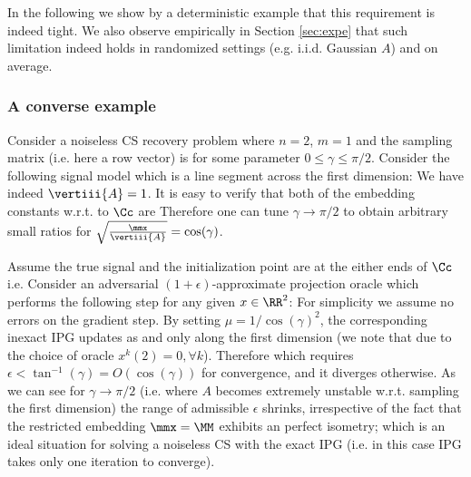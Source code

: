 In the following we show by a deterministic example that this requirement is indeed tight. We also observe empirically in Section \ref{sec:expe} that such limitation indeed holds in randomized settings (e.g. i.i.d. Gaussian $A$) and on average. 

\subsubsection*{A converse example}
Consider a noiseless CS recovery problem where $n =2$, $m=1$ and the sampling matrix (i.e. here a row vector) is
for some parameter $0\leq\gamma\leq\pi/2$. Consider the following signal model which is a line segment across the first dimension:
We have indeed $\vertiii{A}=1$. It is easy to verify that both of the embedding constants w.r.t. to $\Cc$ are
Therefore one can tune $\gamma\rightarrow \pi/2$ to obtain arbitrary small ratios for $\sqrt{\frac{\mmx}{\vertiii{A}}}=\cos(\gamma)$. 

Assume the true signal and the initialization point are at the either ends of $\Cc$ i.e.
Consider an adversarial $(1+\epsilon)$-approximate projection oracle which performs the following step for any given $x\in \RR^2$: 
For simplicity we assume no errors on the gradient step. 	
By setting $\mu=1/\cos(\gamma)^2$, the corresponding inexact IPG updates as 
and only along the first dimension (we note that due to the choice of oracle $x^k(2)=0, \forall k$). Therefore
which requires $\epsilon<\tan^{-1}(\gamma)=O(\cos(\gamma))$ for convergence, and it diverges otherwise. As we can see for $\gamma\rightarrow \pi/2$  (i.e. where $A$ becomes extremely unstable w.r.t. sampling the first dimension) the range of admissible $\epsilon$ shrinks, irrespective of the fact that the restricted embedding $\mmx=\MM$ exhibits an perfect isometry; which is an ideal situation for solving a noiseless CS with the exact IPG (i.e. in this case IPG takes only one iteration to converge).


